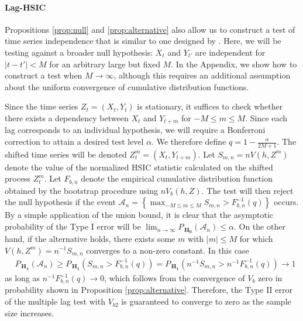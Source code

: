 \documentclass{article} %
\begin{document}
\paragraph{Lag-HSIC}
Propositions \ref{prop:null} and \ref{prop:alternative} also allow us to construct a test of time series independence that is similar to one designed by  \cite{besserve_statistical_2013}. Here, we will be testing against a broader null hypothesis:  $X_t$ and $Y_{t'}$ are independent for $|t-t'|<M$ for an arbitrary large but fixed $M$. In the Appendix, we show how to construct a test when $M\to\infty$, although this requires an additional assumption about the uniform convergence of cumulative distribution functions.

Since the time series $Z_t=(X_t,Y_t)$ is stationary, it suffices to check whether there exists a dependency between $X_t$ and $Y_{t+m}$ for $-M \leq m \leq M$. Since each lag corresponds to an individual hypothesis, we will require a Bonferroni correction to attain a desired test level $\alpha$. We therefore define $q = 1-\frac{\alpha}{2M+1}$. The shifted time series will be denoted $Z_t^m =(X_t,Y_{t+m})$. Let $S_{m,n}=n V(h,Z^m)$ denote the value of the normalized HSIC statistic calculated on the shifted process $Z_t^m$. Let $F_{b,n}$ denote the empirical cumulative distribution function obtained by the bootstrap procedure using $n V_{b}(h,Z)$. The test will then reject the null hypothesis if the event $\mathcal A_n = \left\{ \max_{-M \leq m \leq M} S_{m,n} > F^{-1}_{b,n}(q) \right\}$ occurs. By a simple application of the union bound, it is clear that the asymptotic probability of the Type I error will be $\lim_{n\to\infty}P_{\,\mathbf{H_0}}\left(\mathcal A_n\right)\leq\alpha$. On the other hand, if the alternative holds, there exists some $m$ with $|m|\leq M$ for which $V(h,Z^m)=n^{-1} S_{m,n}$ converges to a non-zero constant. In this case  
\begin{align}
\label{eg:aletrnative1}
&P_{\,\mathbf{H_1}}(\mathcal A_n)  \geq  P_{\,\mathbf{H_1}}( S_{m,n} > F^{-1}_{b,n}(q)) = P_{\,\mathbf{H_1}}( n^{-1} S_{m,n} > n^{-1} F^{-1}_{b,n}(q) ) \to 1
\end{align}
as long as $n^{-1} F^{-1}_{b,n}(q)\to 0$, which follows from the convergence of $V_{b}$ zero in probability shown in Proposition \ref{prop:alternative}. Therefore, the Type II error of the multiple lag test with $V_{b2}$ is guaranteed to converge to zero as the sample size increases.
\end{document}
